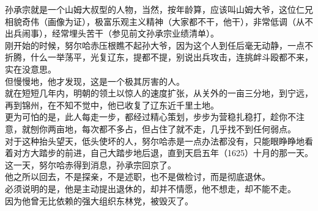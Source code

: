 \begin{multicols}{\theparacolNo}
孙承宗就是一个山姆大叔型的人物，当然，按年龄算，应该叫山姆大爷，这位仁兄相貌奇伟（画像为证），极富乐观主义精神（大家都不干，他干），非常低调（从不出兵闹事），经常埋头苦干（参见前文孙承宗业绩清单）。\\

刚开始的时候，努尔哈赤压根瞧不起孙大爷，因为这个人到任后毫无动静，一点不折腾，什么一举荡平，光复辽东，提都不提，别说出兵攻击，连挑衅斗殴都不来，实在没意思。\\

但慢慢地，他才发现，这是一个极其厉害的人。\\

就在短短几年内，明朝的领土以惊人的速度扩张，从关外的一亩三分地，到宁远，再到锦州，在不知不觉中，他已收复了辽东近千里土地。\\

更为可怕的是，此人每走一步，都经过精心策划，步步为营稳扎稳打，趁你不注意，就刨你两亩地，每次都不多占，但占住了就不走，几乎找不到任何弱点。\\

对于这种抬头望天，低头使坏的人，努尔哈赤是一点办法都没有，只能眼睁睁地看着对方大踏步的前进，自己大踏步地后退，直到天启五年（1625）十月的那一天。\\

这一天，努尔哈赤得到消息，孙承宗回京了。\\

他之所以回去，不是探亲，不是述职，也不是做检讨，而是彻底退休。\\

必须说明的是，他是主动提出退休的，却并不情愿，他不想走，却不能不走。\\

因为他曾无比依赖的强大组织东林党，被毁灭了。\\
\ifnum{}
	\end{multicols}
\fi
\newpage

